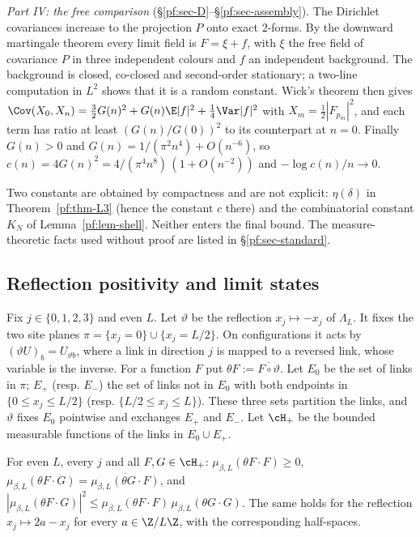 \emph{Part IV: the free comparison} (\S\ref{pf:sec-D}--\S\ref{pf:sec-assembly}). The Dirichlet covariances increase to the projection $P$ onto exact $2$-forms. By the downward martingale theorem every limit field is $F=\xi+f$, with $\xi$ the free field of covariance $P$ in three independent colours and $f$ an independent background. The background is closed, co-closed and second-order stationary; a two-line computation in $L^2$ shows that it is a random constant. Wick's theorem then gives
$\Cov(X_0,X_n)=\tfrac32G(n)^2+G(n)\E|f|^2+\tfrac14\Var|f|^2$ with $X_m=\tfrac12|F_{p_m}|^2$, and each term has ratio at least $(G(n)/G(0))^2$ to its counterpart at $n=0$. Finally $G(n)>0$ and $G(n)=1/(\pi^2n^4)+O(n^{-6})$, so $c(n)=4G(n)^2=4/(\pi^4n^8)\,(1+O(n^{-2}))$ and $-\log c(n)/n\to0$.

Two constants are obtained by compactness and are not explicit: $\eta(\delta)$ in Theorem~\ref{pf:thm-L3} (hence the constant $c$ there) and the combinatorial constant $K_N$ of Lemma~\ref{pf:lem-shell}. Neither enters the final bound. The measure-theoretic facts used without proof are listed in \S\ref{pf:sec-standard}.

\subsection{Reflection positivity and limit states}\label{pf:sec-rp}

Fix $j\in\{0,1,2,3\}$ and even $L$. Let $\vartheta$ be the reflection $x_j\mapsto-x_j$ of $\Lambda_L$. It fixes the two site planes $\pi=\{x_j=0\}\cup\{x_j=L/2\}$. On configurations it acts by $(\vartheta U)_{b}=U_{\vartheta b}$, where a link in direction $j$ is mapped to a reversed link, whose variable is the inverse. For a function $F$ put $\theta F:=\overline{F\circ\vartheta}$.
Let $E_0$ be the set of links in $\pi$; $E_+$ (resp. $E_-$) the set of links not in $E_0$ with both endpoints in $\{0\le x_j\le L/2\}$ (resp. $\{L/2\le x_j\le L\}$). These three sets partition the links, and $\vartheta$ fixes $E_0$ pointwise and exchanges $E_+$ and $E_-$. Let $\cH_+$ be the bounded measurable functions of the links in $E_0\cup E_+$.

\begin{lemma}\label{pf:lem-rp}
For even $L$, every $j$ and all $F,G\in\cH_+$: $\mu_{\beta,L}(\theta F\cdot F)\ge0$, $\mu_{\beta,L}(\theta F\cdot G)=\overline{\mu_{\beta,L}(\theta G\cdot F)}$, and $|\mu_{\beta,L}(\theta F\cdot G)|^2\le\mu_{\beta,L}(\theta F\cdot F)\,\mu_{\beta,L}(\theta G\cdot G)$. The same holds for the reflection $x_j\mapsto2a-x_j$ for every $a\in\Z/L\Z$, with the corresponding half-spaces.
\end{lemma}

